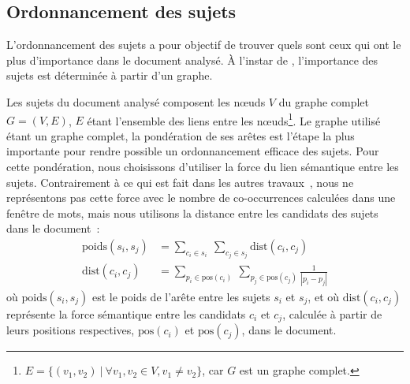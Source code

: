   \subsection{Ordonnancement des sujets}
  \label{subsec:ordonnancement_des_sujets}
    L'ordonnancement des sujets a pour objectif de trouver quels sont ceux qui
    ont le plus d'importance dans le document analysé. À l'instar de
    , l'importance des sujets est déterminée à
    partir d'un graphe.

    Les sujets du document analysé composent les n\oe{}uds $V$ du graphe complet
    $G = (V, E)$, $E$ étant l'ensemble des liens entre les
    n\oe{}uds\footnote{$E = \{(v_1, v_2)\ |\ \forall{v_1, v_2 \in V}, v_1 \neq v_2\}$,
    car $G$ est un graphe complet.}. Le graphe utilisé étant un graphe complet,
    la pondération de ses arêtes est l'étape la plus importante pour rendre
    possible un ordonnancement efficace des sujets. Pour cette pondération, nous
    choisissons d'utiliser la force du lien sémantique entre les sujets.
    Contrairement à ce qui est fait dans les autres
    travaux~\cite{wan2008expandrank,tsatsaronis2010semanticrank,liu2010topicalpagerank},
    nous ne représentons pas cette force avec le nombre de co-occurrences
    calculées dans une fenêtre de mots, mais nous utilisons la distance entre 
    les candidats des sujets dans le document~:
    \begin{align}
      \text{poids}(s_i, s_j) &= \sum_{c_i \in s_i}\ \sum_{c_j \in s_j} \text{dist}(c_i, c_j) \label{math:ponderation}\\
      \text{dist}(c_i, c_j) &= \sum_{p_i \in \text{pos}(c_i)}\ \sum_{p_j \in \text{pos}(c_j)} \frac{1}{|p_i - p_j|} \label{math:distance}
    \end{align}
    où $\text{poids}(s_i, s_j)$ est le poids de l'arête entre les sujets $s_i$
    et $s_j$, et où $\text{dist}(c_i, c_j)$ représente la force sémantique entre
    les candidats $c_i$ et $c_j$, calculée à partir de leurs positions
    respectives, $\text{pos}(c_i)$ et $\text{pos}(c_j)$, dans le document.


